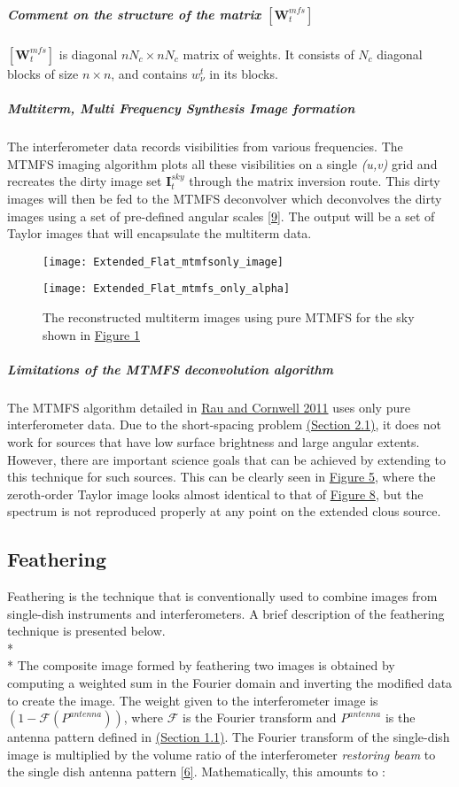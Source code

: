 \documentclass{article}
\begin{document}
\subparagraph{Comment on the structure of the matrix $[\textbf{W}_t^{mfs}]$}
$[\textbf{W}_t^{mfs}]$ is diagonal $nN_c\times nN_c$ matrix of weights. It consists of $N_c$ diagonal blocks of size $n\times n$, and contains $w_\nu^{t}$ in its blocks.
\subparagraph{Multiterm, Multi Frequency Synthesis Image formation}
The interferometer data records visibilities from various frequencies. The MTMFS imaging algorithm plots all these visibilities on a single \textit{(u,v)} grid and recreates the dirty image set $\textbf{I}^{sky}_t$ through the matrix inversion route. This dirty images will then be fed to the MTMFS deconvolver which deconvolves the dirty images using a set of pre-defined angular scales \hyperref[ref9]{[9]}. The output will be a set of Taylor images that will encapsulate the multiterm data.
\begin{figure}
\centering
\begin{minipage}[b]{.45\textwidth}
\texttt{[image: Extended\_Flat\_mtmfsonly\_image]}
\end{minipage}%
\begin{minipage}[b]{.45\linewidth}
\texttt{[image: Extended\_Flat\_mtmfs\_only\_alpha]}
\end{minipage}
\caption{The reconstructed multiterm images using pure MTMFS for the sky shown in \hyperref[ 1]{Figure 1}}
\label{5}
\end{figure}
\subparagraph{Limitations of the MTMFS deconvolution algorithm}
The MTMFS algorithm detailed in \hyperref[urvpaper]{Rau and Cornwell 2011} uses only pure interferometer data. Due to the short-spacing problem \hyperref[shortspacingprob]{(Section 2.1)}, it does not work for sources that have low surface brightness and large angular extents. However, there are important science goals that can be achieved by extending to this technique for such sources. This can be clearly seen in \hyperref[fig5]{Figure 5}, where the zeroth-order Taylor image looks almost identical to that of \hyperref[fig:Extended_Flat_image_tt0]{Figure 8}, but the spectrum is not reproduced properly at any point on the extended clous source.
\label{section2.3}\subsection{Feathering}
Feathering is the technique that is conventionally used to combine images from single-dish instruments and interferometers. A brief description of the feathering technique is presented below. 
\\*\\* The composite image formed by feathering two images is obtained by computing a weighted sum in the Fourier domain and inverting the modified data to create the image. The weight given to the interferometer image is $(1-\mathcal{F}(P^{antenna}))$, where $\mathcal{F}$ is the Fourier transform and $P^{antenna}$ is the antenna pattern defined in \hyperref[section1.1]{(Section 1.1)}. The Fourier transform of the single-dish image is multiplied by the volume ratio of the interferometer \textit{restoring beam} to the single dish antenna pattern \hyperref[ref6]{[6]}. Mathematically, this amounts to : 
\end{document}
